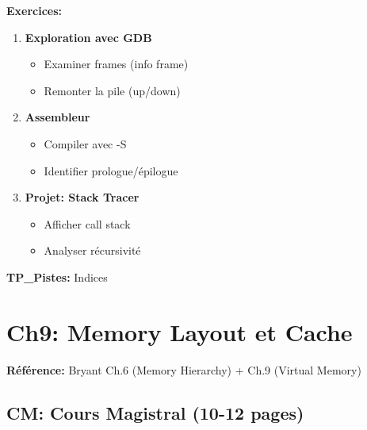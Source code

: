 \documentclass[10pt,a4paper]{article}
\begin{document}
\textbf{Exercices:}
\begin{enumerate}
\item \textbf{Exploration avec GDB}
   \begin{itemize}
   \item Examiner frames (info frame)
   \item Remonter la pile (up/down)
   \end{itemize}

\item \textbf{Assembleur}
   \begin{itemize}
   \item Compiler avec -S
   \item Identifier prologue/épilogue
   \end{itemize}

\item \textbf{Projet: Stack Tracer}
   \begin{itemize}
   \item Afficher call stack
   \item Analyser récursivité
   \end{itemize}
\end{enumerate}

\textbf{TP\_Pistes:} Indices

\newpage

\section{Ch9: Memory Layout et Cache}

\textbf{Référence:} Bryant Ch.6 (Memory Hierarchy) + Ch.9 (Virtual Memory)

\subsection*{CM: Cours Magistral (10-12 pages)}
\end{document}
